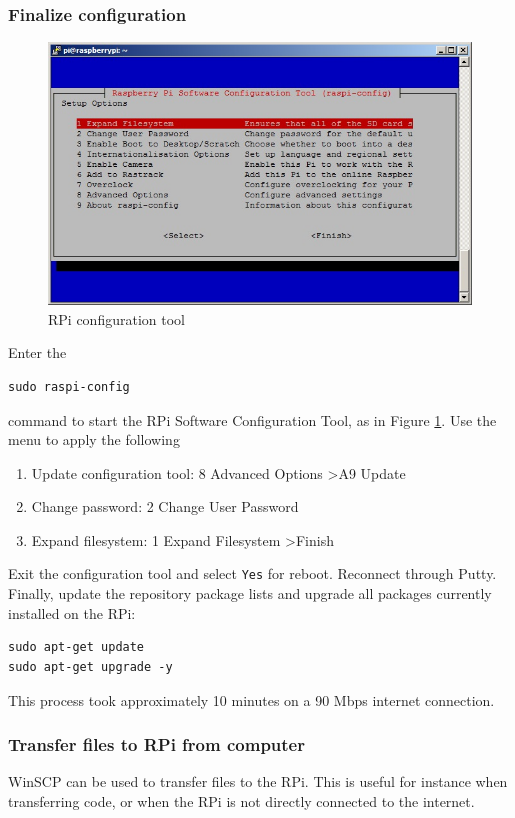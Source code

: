 \documentclass[a4paper,english]{report}
\begin{document}
\subsubsection{Finalize configuration}
\begin{figure}[htb!]
	\centering 
	\includegraphics[scale=0.45]{fig/Rpi_finalize_install} 
	\caption{RPi configuration tool}
	\label{fig: RPi configuration tool} 
\end{figure}
Enter the\begin{verbatim}sudo raspi-config\end{verbatim}command to start the RPi Software Configuration Tool, as in Figure \ref{fig: RPi configuration tool}. Use the menu to apply the following
\begin{enumerate}
	\item Update configuration tool: 8 Advanced Options \textgreater  A9 Update
	\item Change password: 2 Change User Password
	\item Expand filesystem: 1 Expand Filesystem \textgreater  Finish
\end{enumerate}
Exit the configuration tool and select \texttt{Yes} for reboot. Reconnect through Putty.
Finally, update the repository package lists and upgrade all packages currently installed on the RPi:\begin{verbatim}sudo apt-get update 
sudo apt-get upgrade -y\end{verbatim}This process took approximately 10 minutes on a 90 Mbps internet connection. 
\subsubsection{Transfer files to RPi from computer}\label{subsec: Transfer files to RPi}
WinSCP can be used to transfer files to the RPi. This is useful for instance when transferring code, or when the RPi is not directly connected to the internet.
\end{document}
